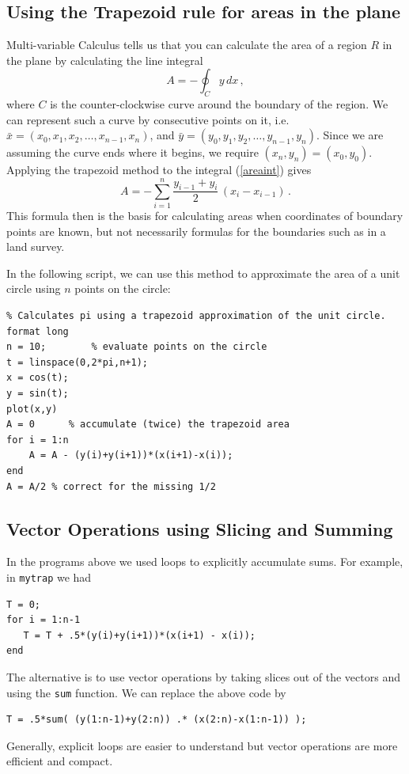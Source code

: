 
\subsection*{Using the Trapezoid rule for areas in the plane}

Multi-variable Calculus tells us that you
can calculate the area of a region $R$ in the plane by calculating
the line integral
\begin{equation}\label{areaint}
   A = - \oint_{C} y \, dx\,,
\end{equation}
where $C$ is the counter-clockwise curve around the boundary of the region.
We can represent such a curve by consecutive points on it, i.e.~
$\bar{x} = (x_0, x_1, x_2, \ldots, x_{n-1}, x_n)$, and
$\bar{y} = (y_0, y_1, y_2, \ldots, y_{n-1}, y_n)$. Since we are
assuming the curve ends where it begins, we require $(x_n,y_n) = (x_0,y_0)$.
Applying the trapezoid method to the integral (\ref{areaint}) gives
$$
    A = - \sum_{i=1}^n \frac{y_{i-1} + y_i}{2} \, (x_i -x_{i-1})\,.
$$
This formula then is the basis for calculating areas when coordinates
of boundary points are known, but not necessarily formulas for the boundaries
such as in a land survey.

In the following script, we can use this method to approximate the
area of a unit circle using $n$ points on the circle:
\begin{lstlisting}
% Calculates pi using a trapezoid approximation of the unit circle.
format long
n = 10;        % evaluate points on the circle
t = linspace(0,2*pi,n+1);
x = cos(t);
y = sin(t);
plot(x,y)
A = 0      % accumulate (twice) the trapezoid area
for i = 1:n
    A = A - (y(i)+y(i+1))*(x(i+1)-x(i));
end
A = A/2 % correct for the missing 1/2
\end{lstlisting}



\subsection*{Vector Operations using Slicing and Summing}

In the programs above we used loops to explicitly accumulate sums. 
For example, in \verb&mytrap& we had
\begin{lstlisting}
T = 0;
for i = 1:n-1
   T = T + .5*(y(i)+y(i+1))*(x(i+1) - x(i));
end
\end{lstlisting}
The alternative is to use vector operations by taking slices out of
the vectors and using the \verb&sum& function. We can replace the above
code by
\begin{lstlisting}
T = .5*sum( (y(1:n-1)+y(2:n)) .* (x(2:n)-x(1:n-1)) );
\end{lstlisting}
Generally, explicit loops are easier to understand but vector
operations are more efficient and compact.


